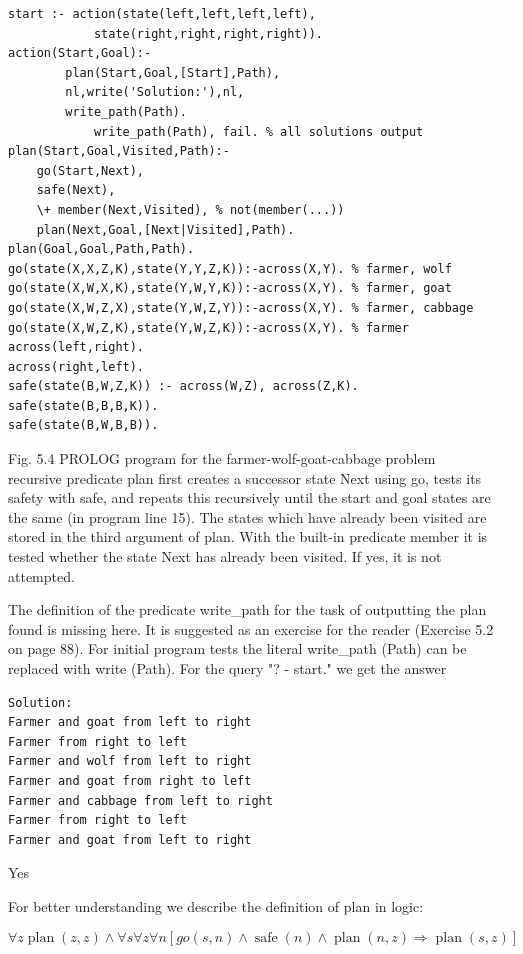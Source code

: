 \documentclass[10pt]{book}
\begin{document}
\begin{center}
\begin{verbatim}
start :- action(state(left,left,left,left),
            state(right,right,right,right)).
action(Start,Goal):-
        plan(Start,Goal,[Start],Path),
        nl,write('Solution:'),nl,
        write_path(Path).
            write_path(Path), fail. % all solutions output
plan(Start,Goal,Visited,Path):-
    go(Start,Next),
    safe(Next),
    \+ member(Next,Visited), % not(member(...))
    plan(Next,Goal,[Next|Visited],Path).
plan(Goal,Goal,Path,Path).
go(state(X,X,Z,K),state(Y,Y,Z,K)):-across(X,Y). % farmer, wolf
go(state(X,W,X,K),state(Y,W,Y,K)):-across(X,Y). % farmer, goat
go(state(X,W,Z,X),state(Y,W,Z,Y)):-across(X,Y). % farmer, cabbage
go(state(X,W,Z,K),state(Y,W,Z,K)):-across(X,Y). % farmer
across(left,right).
across(right,left).
safe(state(B,W,Z,K)) :- across(W,Z), across(Z,K).
safe(state(B,B,B,K)).
safe(state(B,W,B,B)).
\end{verbatim}

Fig. 5.4 PROLOG program for the farmer-wolf-goat-cabbage problem\\

recursive predicate plan first creates a successor state Next using go, tests its safety with safe, and repeats this recursively until the start and goal states are the same (in program line 15). The states which have already been visited are stored in the third argument of plan. With the built-in predicate member it is tested whether the state Next has already been visited. If yes, it is not attempted.

The definition of the predicate write\_path for the task of outputting the plan found is missing here. It is suggested as an exercise for the reader (Exercise 5.2 on page 88). For initial program tests the literal write\_path (Path) can be replaced with write (Path). For the query "? - start." we get the answer

\begin{verbatim}
Solution:
Farmer and goat from left to right
Farmer from right to left
Farmer and wolf from left to right
Farmer and goat from right to left
Farmer and cabbage from left to right
Farmer from right to left
Farmer and goat from left to right
\end{verbatim}

Yes

For better understanding we describe the definition of plan in logic:

$$
\forall z \operatorname{plan}(z, z) \wedge \forall s \forall z \forall n[g o(s, n) \wedge \operatorname{safe}(n) \wedge \operatorname{plan}(n, z) \Rightarrow \operatorname{plan}(s, z)]
$$


\end{center}
\end{document}
